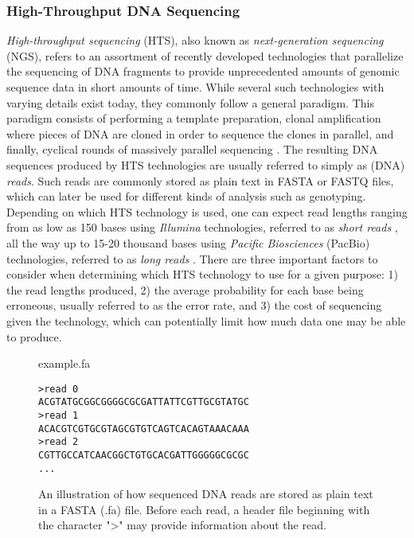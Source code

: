 \subsubsection{High-Throughput DNA Sequencing} \label{background:biology:high_throughput_dna_sequencing}
\textit{High-throughput sequencing} (HTS), also known as \textit{next-generation sequencing} (NGS), refers to an assortment of recently developed technologies that parallelize the sequencing of DNA fragments to provide unprecedented amounts of genomic sequence data in short amounts of time.
While several such technologies with varying details exist today, they commonly follow a general paradigm. 
This paradigm consists of performing a template preparation, clonal amplification where pieces of DNA are cloned in order to sequence the clones in parallel, and finally, cyclical rounds of massively parallel sequencing \cite{hts}.
The resulting DNA sequences produced by HTS technologies are usually referred to simply as (DNA) \textit{reads}.
Such reads are commonly stored as plain text in FASTA or FASTQ files, which can later be used for different kinds of analysis such as genotyping.
Depending on which HTS technology is used, one can expect read lengths ranging from as low as 150 bases using \textit{Illumina} technologies, referred to as \textit{short reads} \cite{illumina_read_length}, all the way up to 15-20 thousand bases using \textit{Pacific Biosciences} (PacBio) technologies, referred to as \textit{long reads} \cite{hts2}.
There are three important factors to consider when determining which HTS technology to use for a given purpose: 1) the read lengths produced, 2) the average probability for each base being erroneous, usually referred to as the error rate, and 3) the cost of sequencing given the technology, which can potentially limit how much data one may be able to produce.

\begin{figure}[H]
\begin{center}
\small{example.fa}
\end{center}
\begin{lstlisting}[style=vcf]
>read 0
ACGTATGCGGCGGGGCGCGATTATTCGTTGCGTATGC
>read 1
ACACGTCGTGCGTAGCGTGTCAGTCACAGTAAACAAA
>read 2
CGTTGCCATCAACGGCTGTGCACGATTGGGGGCGCGC
...
\end{lstlisting}
\caption{
  An illustration of how sequenced DNA reads are stored as plain text in a FASTA (.fa) file.
  Before each read, a header file beginning with the character ">" may provide information about the read.
}
\label{background:biology:high_throughput_dna_sequencing:figures:fasta}
\end{figure}


